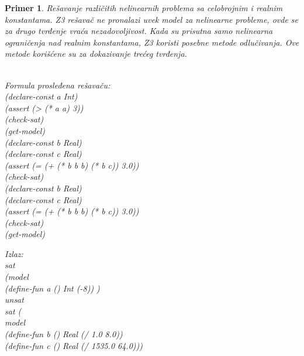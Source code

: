 \documentclass[12pt,oneside]{memoir}
\newtheorem{primer}{Primer}
\begin{document}
\begin{primer} Rešavanje različitih nelinearnih problema sa celobrojnim i realnim konstantama. Z3 rešavač ne pronalazi uvek model za nelinearne probleme, ovde se za drugo tvrđenje vraća nezadovoljivost. Kada su prisutna samo nelinearna ograničenja nad realnim konstantama, Z3 koristi posebne metode odlučivanja. Ove metode korišćene su za dokazivanje trećeg tvrđenja.\\ \\
\begin{minipage}[b]{0.4\textwidth}
Formula prosleđena rešavaču:
\\(declare-const a Int)
\\(assert (> (* a a) 3))
\\(check-sat)
\\(get-model)
\\(declare-const b Real)
\\(declare-const c Real)
\\(assert (= (+ (* b b b) (* b c)) 3.0))
\\(check-sat)
\\(declare-const b Real)
\\(declare-const c Real)
\\(assert (= (+ (* b b b) (* b c)) 3.0))
\\(check-sat)
\\(get-model)

\end{minipage}
\hspace{2.6cm}
\begin{minipage}[t]{0.4\textwidth}
\vspace{-9.75cm}
Izlaz:
\\sat 
\\(model 
\\(define-fun a () Int (-8)) ) 
\\unsat 
\\sat (
\\model 
\\(define-fun b () Real (/ 1.0 8.0)) 
\\(define-fun c () Real (/ 1535.0 64.0)))
\end{minipage}
\end{primer}
\end{document}
